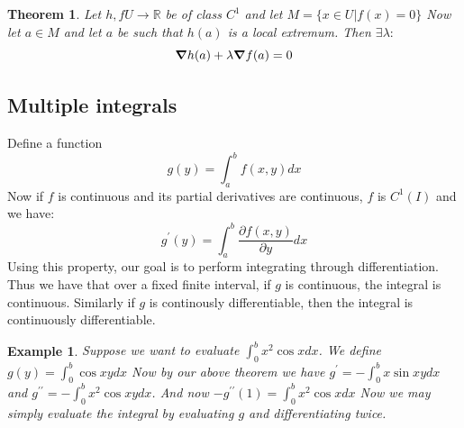 \documentclass[titlepage]{article}
\newtheorem{theorem}{Theorem}[section]
\newtheorem{example}{Example}[section]
\begin{document}
\begin{theorem}
Let $h,f U \to \mathbb{R}$ be of class $C^{1}$ and let $M = \{x\in U|f(x)=0\}$ Now let $a \in M$ and let $a$ be such that $h(a)$ is a local extremum. Then $\exists \lambda:$
$$\grad h(a) + \lambda \grad f(a) = 0$$

\end{theorem}


\subsection{Multiple integrals}

Define a function $$g(y) = \int_{a}^{b} f(x,y)dx$$ Now if $f$ is continuous and its partial derivatives are continuous, $f$ is $C^{1}(I)$ and we have:
$$g^{\prime}(y) = \int_{a}^{b} \frac{\partial f(x,y)}{\partial y}dx$$ Using this property, our goal is to perform integrating through differentiation. Thus we have that over a fixed finite interval, if $g$ is continuous, the integral is continuous. Similarly if $g$ is continously differentiable, then the integral is continuously differentiable. 

\begin{example}
Suppose we want to evaluate $\int_{0}^{b}x^{2}\cos{x}dx$. We define $g(y) = \int_{0}^{b}\cos{xy}dx$ Now by our above theorem we have $g^{\prime} = - \int_{0}^{b}x \sin{xy} dx$ and $g^{\prime\prime} = - \int_{0}^{b}x^{2} \cos{xy} dx$. And now $-g^{\prime\prime}(1) = \int_{0}^{b}x^{2} \cos{x} dx $ Now we may simply evaluate the integral by evaluating $g$ and differentiating twice. 
\end{example}
\end{document}
